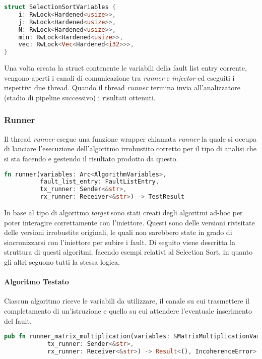 \begin{lstlisting}[language=Rust, style=boxed]
struct SelectionSortVariables {
    i: RwLock<Hardened<usize>>,
    j: RwLock<Hardened<usize>>,
    N: RwLock<Hardened<usize>>,
    min: RwLock<Hardened<usize>>,
    vec: RwLock<Vec<Hardened<i32>>>,
}
\end{lstlisting}

Una volta creata la struct contenente le variabili della fault list entry corrente, vengono aperti i canali di comunicazione tra \textit{runner} e \textit{injector} ed eseguiti i rispettivi due thread. Quando il thread \textit{runner} termina invia all'analizzatore (stadio di pipeline successivo) i risultati ottenuti.

\subsubsection{Runner}
Il thread \textit{runner} esegue una funzione wrapper chiamata \textit{runner} la quale si occupa di lanciare l'esecuzione dell'algoritmo irrobustito corretto per il tipo di analisi che si sta facendo e gestendo il risultato prodotto da questo. 

\begin{lstlisting}[language=Rust, style=boxed]
fn runner(variables: Arc<AlgorithmVariables>,
          fault_list_entry: FaultListEntry,
          tx_runner: Sender<&str>,
          rx_runner: Receiver<&str>) -> TestResult
\end{lstlisting}

In base al tipo di algoritmo \textit{target} sono stati creati degli algoritmi ad-hoc per poter interagire correttamente con l'iniettore. Questi sono delle versioni rivisitate delle versioni irrobustite originali, le quali non sarebbero state in grado di sincronizzarsi con l'iniettore per subire i fault. Di seguito viene descritta la struttura di questi algoritmi, facendo esempi relativi al Selection Sort, in quanto gli altri seguono tutti la stessa logica. 

\paragraph{Algoritmo Testato}
Ciascun algoritmo riceve le variabili da utilizzare, il canale su cui trasmettere il completamento di un'istruzione e quello su cui attendere l'eventuale inserimento del fault.

\begin{lstlisting}[language=Rust, style=boxed]
pub fn runner_matrix_multiplication(variables: &MatrixMultiplicationVariables, 
            tx_runner: Sender<&str>, 
            rx_runner: Receiver<&str>) -> Result<(), IncoherenceError>
\end{lstlisting}

